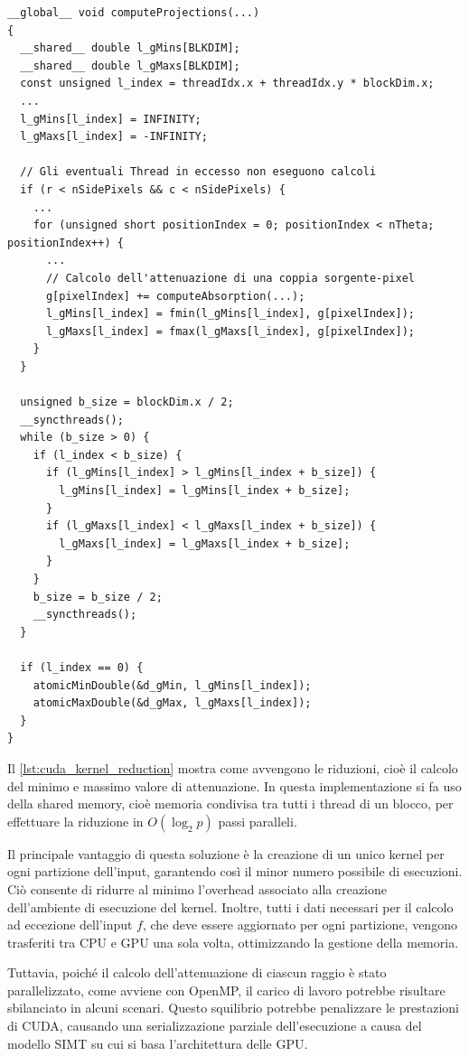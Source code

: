 \documentclass[12pt,a4paper]{report}
\begin{document}
\begin{lstlisting}[language=CStyle, caption={Codice CUDA-C per effettuare la riduzione nel kernel.}, label={lst:cuda_kernel_reduction}]
__global__ void computeProjections(...)
{
  __shared__ double l_gMins[BLKDIM];
  __shared__ double l_gMaxs[BLKDIM];
  const unsigned l_index = threadIdx.x + threadIdx.y * blockDim.x;
  ...
  l_gMins[l_index] = INFINITY;
  l_gMaxs[l_index] = -INFINITY;

  // Gli eventuali Thread in eccesso non eseguono calcoli
  if (r < nSidePixels && c < nSidePixels) {
    ...
    for (unsigned short positionIndex = 0; positionIndex < nTheta; positionIndex++) {
      ...
      // Calcolo dell'attenuazione di una coppia sorgente-pixel
      g[pixelIndex] += computeAbsorption(...);
      l_gMins[l_index] = fmin(l_gMins[l_index], g[pixelIndex]);
      l_gMaxs[l_index] = fmax(l_gMaxs[l_index], g[pixelIndex]);
    }
  }

  unsigned b_size = blockDim.x / 2;
  __syncthreads();
  while (b_size > 0) {
    if (l_index < b_size) {
      if (l_gMins[l_index] > l_gMins[l_index + b_size]) {
        l_gMins[l_index] = l_gMins[l_index + b_size];
      }
      if (l_gMaxs[l_index] < l_gMaxs[l_index + b_size]) {
        l_gMaxs[l_index] = l_gMaxs[l_index + b_size];
      }
    }
    b_size = b_size / 2;
    __syncthreads();
  }

  if (l_index == 0) {
    atomicMinDouble(&d_gMin, l_gMins[l_index]);
    atomicMaxDouble(&d_gMax, l_gMaxs[l_index]);
  }
}
\end{lstlisting}

Il \autoref{lst:cuda_kernel_reduction} mostra come avvengono le riduzioni, cioè il calcolo del minimo e massimo valore di
attenuazione.
In questa implementazione si fa uso della shared memory, cioè memoria condivisa tra tutti i thread di un blocco, per effettuare la
riduzione in \(O(\log_2 p)\) passi paralleli.

Il principale vantaggio di questa soluzione è la creazione di un unico kernel per ogni partizione dell'input, garantendo così il
minor numero possibile di esecuzioni.
Ciò consente di ridurre al minimo l'overhead associato alla creazione dell'ambiente di esecuzione del kernel.
Inoltre, tutti i dati necessari per il calcolo ad eccezione dell'input \(f\), che deve essere aggiornato per ogni partizione,
vengono trasferiti tra CPU e GPU una sola volta, ottimizzando la gestione della memoria.

Tuttavia, poiché il calcolo dell'attenuazione di ciascun raggio è stato parallelizzato, come avviene con OpenMP, il carico di
lavoro potrebbe risultare sbilanciato in alcuni scenari.
Questo squilibrio potrebbe penalizzare le prestazioni di CUDA, causando una serializzazione parziale dell'esecuzione a causa del
modello SIMT su cui si basa l'architettura delle GPU.
\end{document}

